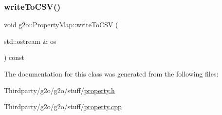 \subsubsection{\texorpdfstring{write\+To\+C\+S\+V()}{writeToCSV()}}
{\footnotesize\ttfamily void g2o\+::\+Property\+Map\+::write\+To\+C\+SV (\begin{DoxyParamCaption}\item[{std\+::ostream \&}]{os }\end{DoxyParamCaption}) const}



The documentation for this class was generated from the following files\+:\begin{DoxyCompactItemize}
\item 
Thirdparty/g2o/g2o/stuff/\mbox{\hyperlink{property_8h}{property.\+h}}\item 
Thirdparty/g2o/g2o/stuff/\mbox{\hyperlink{property_8cpp}{property.\+cpp}}\end{DoxyCompactItemize}
